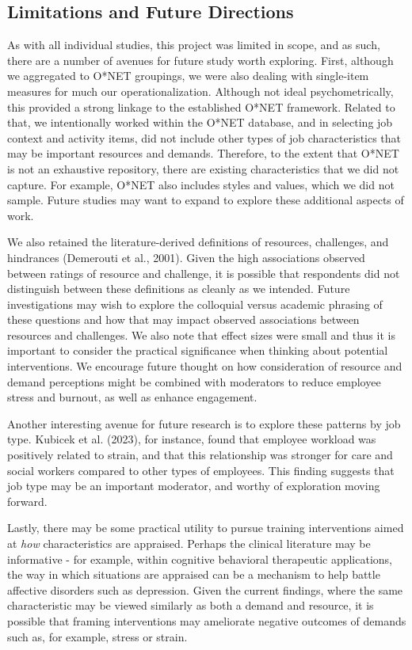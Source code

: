 \documentclass[
  man]{apa7}
\begin{document}
\hypertarget{limitations-and-future-directions}{%
\subsection{Limitations and Future Directions}\label{limitations-and-future-directions}}

As with all individual studies, this project was limited in scope, and as such, there are a number of avenues for future study worth exploring. First, although we aggregated to O*NET groupings, we were also dealing with single-item measures for much our operationalization. Although not ideal psychometrically, this provided a strong linkage to the established O*NET framework. Related to that, we intentionally worked within the O*NET database, and in selecting job context and activity items, did not include other types of job characteristics that may be important resources and demands. Therefore, to the extent that O*NET is not an exhaustive repository, there are existing characteristics that we did not capture. For example, O*NET also includes styles and values, which we did not sample. Future studies may want to expand to explore these additional aspects of work.

We also retained the literature-derived definitions of resources, challenges, and hindrances (Demerouti et al., 2001). Given the high associations observed between ratings of resource and challenge, it is possible that respondents did not distinguish between these definitions as cleanly as we intended. Future investigations may wish to explore the colloquial versus academic phrasing of these questions and how that may impact observed associations between resources and challenges. We also note that effect sizes were small and thus it is important to consider the practical significance when thinking about potential interventions. We encourage future thought on how consideration of resource and demand perceptions might be combined with moderators to reduce employee stress and burnout, as well as enhance engagement.

Another interesting avenue for future research is to explore these patterns by job type. Kubicek et al. (2023), for instance, found that employee workload was positively related to strain, and that this relationship was stronger for care and social workers compared to other types of employees. This finding suggests that job type may be an important moderator, and worthy of exploration moving forward.

Lastly, there may be some practical utility to pursue training interventions aimed at \emph{how} characteristics are appraised. Perhaps the clinical literature may be informative - for example, within cognitive behavioral therapeutic applications, the way in which situations are appraised can be a mechanism to help battle affective disorders such as depression. Given the current findings, where the same characteristic may be viewed similarly as both a demand and resource, it is possible that framing interventions may ameliorate negative outcomes of demands such as, for example, stress or strain.
\end{document}
